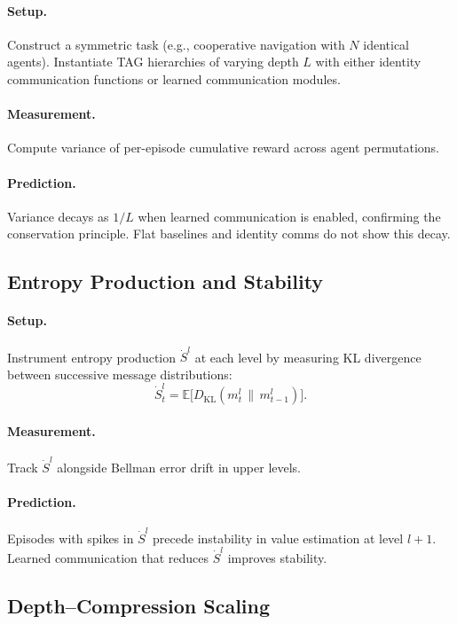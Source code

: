 \documentclass[11pt,a4paper]{article}
\begin{document}
\paragraph{Setup.}
Construct a symmetric task (e.g., cooperative navigation with $N$ identical
agents). Instantiate TAG hierarchies of varying depth $L$ with either identity
communication functions or learned communication modules.

\paragraph{Measurement.}
Compute variance of per-episode cumulative reward across agent permutations.

\paragraph{Prediction.}
Variance decays as $1/L$ when learned communication is enabled, confirming the
conservation principle. Flat baselines and identity comms do not show this
decay.

\subsection{Entropy Production and Stability}

\paragraph{Setup.}
Instrument entropy production $\dot S^l$ at each level by measuring KL
divergence between successive message distributions:
\[
\dot S^l_t = \mathbb{E}\big[ D_{\mathrm{KL}}(m^l_t \,\|\, m^l_{t-1}) \big].
\]

\paragraph{Measurement.}
Track $\dot S^l$ alongside Bellman error drift in upper levels.

\paragraph{Prediction.}
Episodes with spikes in $\dot S^l$ precede instability in value estimation at
level $l{+}1$. Learned communication that reduces $\dot S^l$ improves stability.

\subsection{Depth--Compression Scaling}
\end{document}
